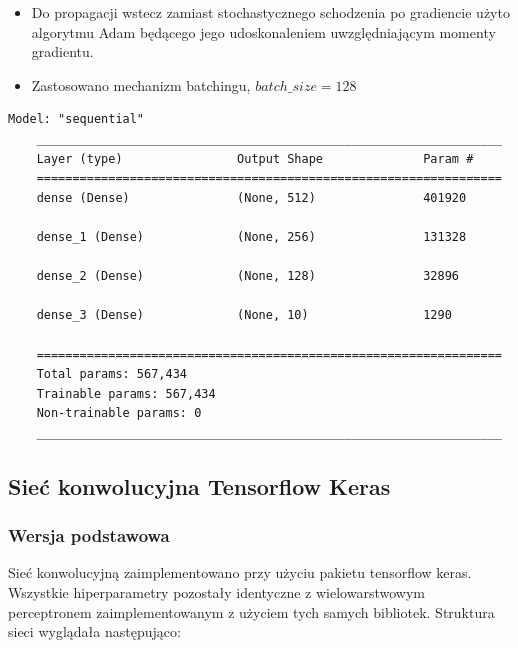 \documentclass{article}
\begin{document}
\begin{itemize}
\item Do propagacji wstecz zamiast stochastycznego schodzenia po gradiencie użyto algorytmu 
Adam będącego jego udoskonaleniem uwzględniającym momenty gradientu.
\item Zastosowano mechanizm batchingu, $batch\_size = 128$
\end{itemize}

\begin{lstlisting}[style=siec]
    Model: "sequential"
    _________________________________________________________________
    Layer (type)                Output Shape              Param #
    =================================================================
    dense (Dense)               (None, 512)               401920

    dense_1 (Dense)             (None, 256)               131328

    dense_2 (Dense)             (None, 128)               32896

    dense_3 (Dense)             (None, 10)                1290
                                                                    
    =================================================================
    Total params: 567,434
    Trainable params: 567,434
    Non-trainable params: 0
    _________________________________________________________________
\end{lstlisting}
\subsection{Sieć konwolucyjna Tensorflow Keras}

\subsubsection{Wersja podstawowa}
Sieć konwolucyjną zaimplementowano przy użyciu pakietu tensorflow keras. Wszystkie hiperparametry pozostały 
identyczne z wielowarstwowym perceptronem zaimplementowanym z użyciem tych samych bibliotek. 
Struktura sieci wyglądała następująco:

\end{document}
